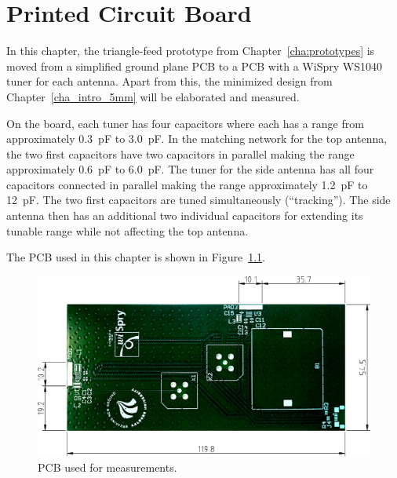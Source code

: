 \chapter{Printed Circuit Board}
\label{cha:pcb}

In this chapter, the triangle-feed prototype from Chapter~\ref{cha:prototypes} is moved from a simplified ground plane PCB to a PCB with a WiSpry WS1040 tuner for each antenna. Apart from this, the minimized design from Chapter~\ref{cha_intro_5mm} will be elaborated and measured.

On the board, each tuner has four capacitors where each has a range from approximately \SI{0.3}{pF} to \SI{3.0}{pF}. In the matching network for the top antenna, the two first capacitors have two capacitors in parallel making the range approximately \SI{0.6}{pF} to \SI{6.0}{pF}. The tuner for the side antenna has all four capacitors connected in parallel making the range approximately \SI{1.2}{pF} to \SI{12}{pF}. The two first capacitors are tuned simultaneously (``tracking''). The side antenna then has an additional two individual capacitors for extending its tunable range while not affecting the top antenna.

The PCB used in this chapter is shown in Figure~\ref{fig:samanthas_board}.

\begin{figure}[htbp]
    \centering
    \includegraphics[scale=0.5]{img/tech_sol/samanthas_board.pdf}
    \caption{PCB used for measurements.}
    \label{fig:samanthas_board}
\end{figure}
